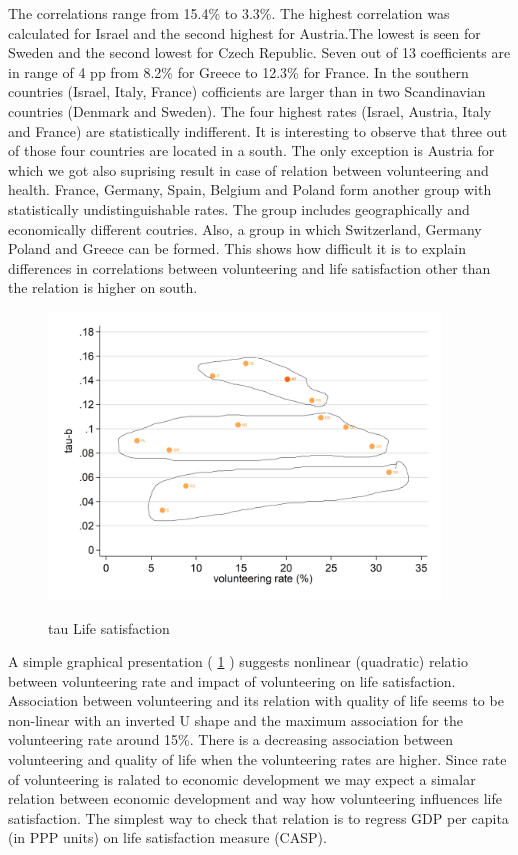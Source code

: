 \documentclass[10pt, letterpaper]{article}
\begin{document}
\begin{spacing}{1.4}
\begin{spacing}{.9}
	 
      \label{tauLS} 
\end{spacing}

The correlations range from 15.4\% to 3.3\%. The highest correlation was calculated for Israel and the second highest for Austria.The lowest is seen for Sweden and the second lowest for Czech Republic.  Seven out of 13 coefficients are in range of 4 pp from 8.2\% for Greece to 12.3\% for France.  In the southern countries (Israel, Italy, France) cofficients are larger than in two Scandinavian countries (Denmark and Sweden).  The four highest rates (Israel, Austria, Italy and France) are statistically indifferent. It is interesting to observe that three out of those four countries are located in a south. The only exception is Austria for which we got also suprising result in case of relation between volunteering and health. France, Germany, Spain, Belgium and Poland form another group with statistically undistinguishable rates. The group includes geographically and economically different coutries. Also, a group in which Switzerland, Germany Poland and Greece can be formed. This shows how difficult it is to explain differences in correlations between volunteering and life satisfaction other than the relation is higher on south. \\


\begin{figure}[H]
 \includegraphics[height=3in]{Kendall_casp_petla.png}
 \centering
 \label{fig:tauLS}
\caption{tau Life satisfaction}
\end{figure}

A simple graphical presentation ( \ref{fig:tauLS} ) suggests nonlinear (quadratic) relatio between volunteering rate and impact of volunteering on life satisfaction. Association between volunteering and its relation with quality of life seems to be non-linear with an inverted U shape and the maximum association for the volunteering rate around 15\%. There is a decreasing association between volunteering and quality of life when the volunteering rates are higher. Since rate of volunteering is ralated to economic development we may expect a simalar relation between economic development and way how volunteering influences life satisfaction. The simplest way to check that relation is to regress GDP per capita (in PPP units) on life satisfaction measure (CASP). 


\end{spacing}
\end{document}
